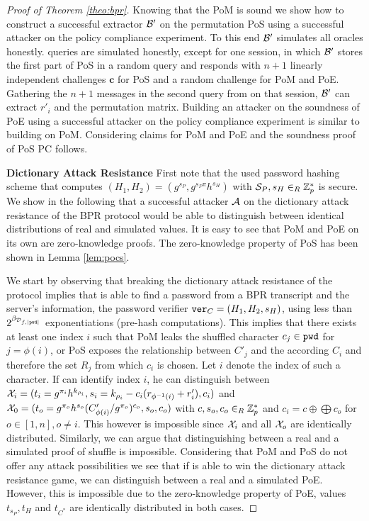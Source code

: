 \begin{proof}[Proof of Theorem \ref{theo:bpr}]
Knowing that the \acl{PoM} is sound we show how to construct a successful extractor $\mathcal{B}'$ on the permutation \ac{PoS} using a successful attacker \cA on the policy compliance experiment.
To this end $\mathcal{B}'$ simulates all \Execute oracles honestly.
\Send queries are simulated honestly, except for one session, in which $\mathcal{B}'$ stores the first part of \ac{PoS} in a random \Send query and responds with $n+1$ linearly independent challenges $\bm c$ for \ac{PoS} and a random challenge \Client for \ac{PoM} and \ac{PoE}.
Gathering the $n+1$ messages in the second \Send query from \cA on that session, $\mathcal{B}'$ can extract $r'_i$ and the permutation matrix.
Building an attacker on the soundness of \ac{PoE} using a successful attacker \cA on the policy compliance experiment is similar to building \cB on \ac{PoM}.
Considering claims for \ac{PoM} and \ac{PoE} and the soundness proof of \ac{PoS} \acl{PC} follows.

\smallskip\noindent
\textbf{Dictionary Attack Resistance}
First note that the used password hashing scheme that computes $(H_1,H_2)=(g^{s_P},\allowbreak g^{s_P \pi}h^{s_H})$ with $\mathcal{S}_P,s_H\in_R\mathbb{Z}^\ast_p$ is secure.
We show in the following that a successful attacker $\mathcal{A}$ on the dictionary attack resistance of the \ac{BPR} protocol would be able to distinguish between identical distributions of real and simulated values.
It is easy to see that \ac{PoM} and \ac{PoE} on its own are zero-knowledge proofs.
The zero-knowledge property of \ac{PoS} has been shown in Lemma \ref{lem:pocs}.

We start by observing that breaking the dictionary attack resistance of the protocol implies that \cA is able to find a password \pwd from a \ac{BPR} transcript and the server's information, \ie the password verifier $\mathtt{ver}_C=(H_1,H_2,s_H)$, using less than $2^{\beta_{\mathcal{D}_{f,|\mathtt{pwd}|}}}$ exponentiations (pre-hash computations).
This implies that there exists at least one index $i$ such that \ac{PoM} leaks the shuffled character $c_j\in\mathtt{pwd}$ for $j=\phi(i)$, or \ac{PoS} exposes the relationship between $C'_j$ and the according $C_i$ and therefore the set $R_j$ from which $c_i$ is chosen.
Let $i$ denote the index of such a character.
If \cA can identify index $i$, he can distinguish between $\mathcal{X}_i=(t_i=g^{\pi_i}h^{k_{\rho_i}}, s_i=k_{\rho_i}-c_i(r_{\phi^{-1}(i)}+r'_i), c_i)$ and $\mathcal{X}_0=(t_o=g^{\pi_o}h^{s_o}(C'_{\phi(i)}/g^{\pi_o})^{c_o}, s_o, c_o)$ with $c,s_o,c_o\in_R\mathbb{Z}^\ast_p$ and $c_i=c\oplus \bigoplus c_o$ for $o\in[1,n], o\not=i$.
This however is impossible since $\mathcal{X}_i$ and all $\mathcal{X}_o$ are identically distributed.
Similarly, we can argue that distinguishing between a real and a simulated proof of shuffle is impossible.
Considering that \ac{PoM} and \ac{PoS} do not offer any attack possibilities we see that if \cA is able to win the dictionary attack resistance game, we can distinguish between a real and a simulated \ac{PoE}.
However, this is impossible due to the zero-knowledge property of \ac{PoE}, \ie values $t_{s_P}, t_H$ and $t_{C^\ast}$ are identically distributed in both cases.


\end{proof}
